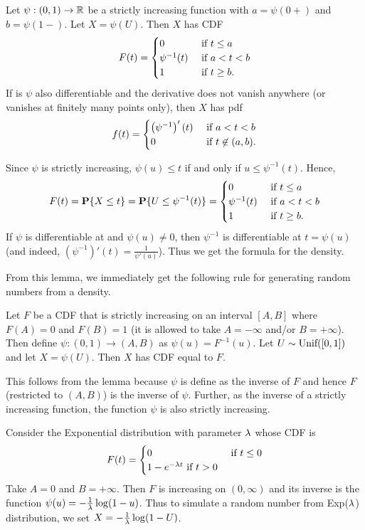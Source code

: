\documentclass[preprint,  11pt]{amsart}
\begin{document}
\begin{lemma} Let $\psi:(0,1)\rightarrow \mathbb{R}$ be a  strictly increasing function with $a=\psi(0+)$ and $b=\psi(1-)$. Let $X=\psi(U)$. Then $X$ has CDF 
$$
F(t)=\begin{cases} 0 & \mbox{ if }t\le a \\ \psi^{-1}(t) & \mbox{ if }a<t<b \\ 1 & \mbox{ if }t\ge b. \end{cases}
$$ 
If is $\psi$  also differentiable and the derivative does not vanish anywhere (or vanishes at finitely many points only), then $X$ has pdf 
$$
f(t)=\begin{cases} \left(\psi^{-1}\right)'(t) & \mbox{ if }a<t<b\\ 0 & \mbox{ if }t\not\in (a,b). \end{cases}
$$
\end{lemma}
\bprf Since $\psi$ is strictly increasing, $\psi(u)\le t$ if and only if $u\le \psi^{-1}(t)$. Hence,
$$
F(t)=\mathbf{P}\{X\le t\} = \mathbf{P}\{U\le \psi^{-1}(t)\} = \begin{cases} 0 & \mbox{ if }t\le a \\ \psi^{-1}(t) & \mbox{ if }a<t<b \\ 1 & \mbox{ if }t\ge b. \end{cases}
$$
If $\psi$ is differentiable at and $\psi(u)\not=0$, then $\psi^{-1}$ is differentiable at $t=\psi(u)$ (and indeed, $(\psi^{-1})'(t)=\frac{1}{\psi'(u)}$). Thus we get the formula for the density.
\eprf

From this lemma, we immediately get the following rule for generating random numbers from a density. 

 Let $F$ be a CDF that is strictly increasing on an interval $[A,B]$ where $F(A)=0$ and $F(B)=1$ (it is allowed to take $A=-\infty$ and/or $B=+\infty$). Then define $\psi:(0,1)\to (A,B)$ as $\psi(u)=F^{-1}(u)$. Let $U\sim \mbox{Unif}([0,1])$ and let $X=\psi(U)$. Then $X$ has CDF equal to $F$.

This follows from the lemma because $\psi$ is define as the inverse of $F$ and hence $F$ (restricted to $(A,B)$) is the inverse of $\psi$. Further, as the inverse of a strictly increasing function, the function $\psi$  is also strictly increasing.

\beg Consider the Exponential distribution with parameter $\lambda$ whose CDF is 
$$
F(t)=\begin{cases} 0 & \mbox{ if }t\le 0 \\ 1-e^{-\lambda t} \mbox{ if }t>0 \end{cases}
$$ Take $A=0$ and $B=+\infty$. Then $F$ is increasing on $(0,\infty)$ and its inverse is the function $\psi(u)=-\frac{1}{\lambda}\log(1-u)$. Thus to simulate a random number from Exp($\lambda$) distribution, we set $X=-\frac{1}{\lambda}\log(1-U)$.
\eeg
\end{document}
